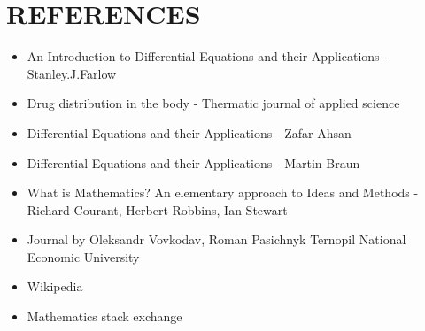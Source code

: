 \chapter*{\textbf{REFERENCES}}
\thispagestyle{empty}



\begin{itemize}
	\item An Introduction to Differential Equations and their Applications - Stanley.J.Farlow
	\item Drug distribution in the body - Thermatic journal of applied science 
	\item Differential Equations and their Applications - Zafar Ahsan
	\item Differential Equations and their Applications - Martin Braun
	\item What is Mathematics? An elementary approach to Ideas and Methods - Richard Courant, Herbert Robbins, Ian Stewart
	\item Journal by Oleksandr Vovkodav, Roman Pasichnyk
	Ternopil National Economic University
	\item Wikipedia
	\item Mathematics stack exchange
\end{itemize}